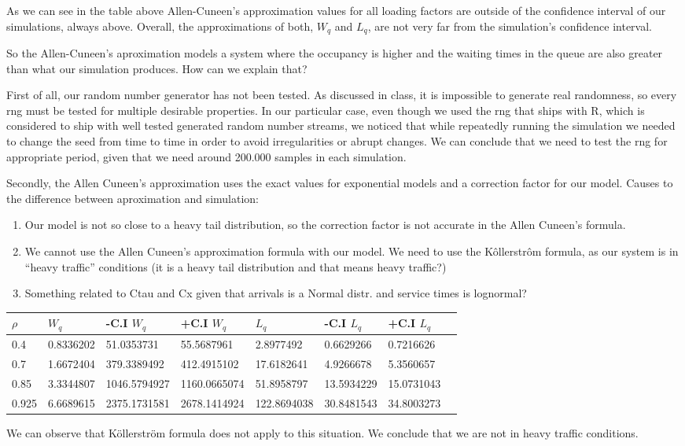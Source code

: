 \documentclass[]{article}
\providecommand{\tightlist}{%
  \setlength{\itemsep}{0pt}\setlength{\parskip}{0pt}}
\begin{document}
As we can see in the table above Allen-Cuneen's approximation values for
all loading factors are outside of the confidence interval of our
simulations, always above. Overall, the approximations of both, \(W_q\)
and \(L_{q}\), are not very far from the simulation's confidence
interval.

So the Allen-Cuneen's aproximation models a system where the occupancy
is higher and the waiting times in the queue are also greater than what
our simulation produces. How can we explain that?

First of all, our random number generator has not been tested. As
discussed in class, it is impossible to generate real randomness, so
every rng must be tested for multiple desirable properties. In our
particular case, even though we used the rng that ships with R, which is
considered to ship with well tested generated random number streams, we
noticed that while repeatedly running the simulation we needed to change
the seed from time to time in order to avoid irregularities or abrupt
changes. We can conclude that we need to test the rng for appropriate
period, given that we need around 200.000 samples in each simulation.

Secondly, the Allen Cuneen's approximation uses the exact values for
exponential models and a correction factor for our model. Causes to the
difference between aproximation and simulation:

\begin{enumerate}
\def\labelenumi{\arabic{enumi}.}
\tightlist
\item
  Our model is not so close to a heavy tail distribution, so the
  correction factor is not accurate in the Allen Cuneen's formula.
\item
  We cannot use the Allen Cuneen's approximation formula with our model.
  We need to use the Kôllerstrôm formula, as our system is in ``heavy
  traffic'' conditions (it is a heavy tail distribution and that means
  heavy traffic?)
\item
  Something related to Ctau and Cx given that arrivals is a Normal
  distr. and service times is lognormal?
\end{enumerate}

\begin{longtable}[]{@{}llllllll@{}}
\toprule
\(\rho\) & \(W_{q}\) & -C.I \(W_{q}\) & +C.I \(W_{q}\) & \(L_{q}\) &
-C.I \(L_{q}\) & +C.I \(L_{q}\) &\tabularnewline
\midrule
\endhead
0.4 & 0.8336202 & 51.0353731 & 55.5687961 & 2.8977492 & 0.6629266 &
0.7216626\tabularnewline
0.7 & 1.6672404 & 379.3389492 & 412.4915102 & 17.6182641 & 4.9266678 &
5.3560657\tabularnewline
0.85 & 3.3344807 & 1046.5794927 & 1160.0665074 & 51.8958797 & 13.5934229
& 15.0731043\tabularnewline
0.925 & 6.6689615 & 2375.1731581 & 2678.1414924 & 122.8694038 &
30.8481543 & 34.8003273\tabularnewline
\bottomrule
\end{longtable}

We can observe that Köllerström formula does not apply to this
situation. We conclude that we are not in heavy traffic conditions.
\end{document}
